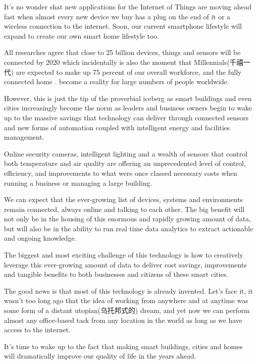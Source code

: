 \documentclass[UTF8,11pt]{ctexart}
\begin{document}
It’s no wonder shat new applications for the Internet of Things are moving ahead fast when almost every new device we buy has a plug on the end of it or a wireless connection to the internet. Soon, our current smartphone lifestyle will expand to create our own smart home lifestyle too.


All researches agree that close to 25 billion devices, things and sensors will be connected by 2020 which incidentally is also the moment that Millennials(千禧一代) are expected to make up 75 percent of our overall workforce, and the fully connected home . become a reality for large numbers of people worldwide.


However, this is just the tip of the proverbial iceberg as smart buildings and even cities increasingly become the norm as leaders and business owners begin to wake up to the massive savings that technology can deliver through connected sensors and new forms of automation coupled with intelligent energy and facilities management.


Online security cameras, intelligent lighting and a wealth of sensors that control both temperature and air quality are offering an unprecedented level of control, efficiency, and improvements to what were once classed necessary costs when running a business or managing a large building.


We can expect that the ever-growing list of devices, systems and environments remain connected, always online and talking to each other. The big benefit will not only be in the housing of this enormous and rapidly growing amount of data, but will also be in the ability to run real time data analytics to extract actionable and ongoing knowledge.


The biggest and most exciting challenge of this technology is how to creatively leverage this ever-growing amount of data to deliver cost savings, improvements and tangible benefits to both businesses and citizens of these smart cities.


The good news is that most of this technology is already invented. Let's face it, it wasn't too long ago that the idea of working from anywhere and at anytime was some form of a distant utopian(乌托邦式的) dream, and yet now we can perform almost any office-based task from any location in the world as long as we have access to the internet.


It's time to wake up to the fact that making smart buildings, cities and homes will dramatically improve our quality of life in the years ahead.
\end{document}
